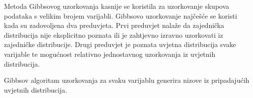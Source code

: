 


Metoda Gibbsovog uzorkovanja kasnije se koristila za uzorkovanje skupova podataka s velikim brojem varijabli. Gibbsovo uzorkovanje najčešće se koristi kada su zadovoljena dva preduvjeta. Prvi preduvjet nalaže da zajednička distribucija  nije eksplicitno poznata ili je zahtjevno izravno uzorkovati iz zajedničke distribucije. Drugi preduvjet je poznata uvjetna distribucija svake varijable te mogućnost relativno jednostavnog uzorkovanja iz uvjetnih distribucija. 

Gibbsov algoritam uzorkovanja za svaku varijablu generira nizove iz pripadajućih uvjetnih distribucija.  





